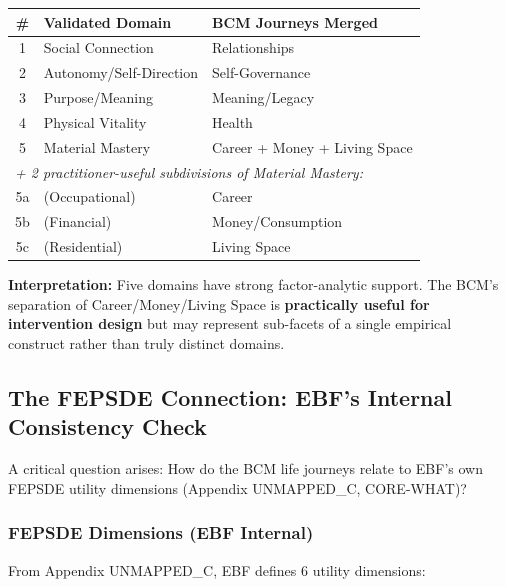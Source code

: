 \begin{center}
\begin{tabular}{@{}clp{5cm}@{}}
\toprule
\textbf{\#} & \textbf{Validated Domain} & \textbf{BCM Journeys Merged} \\
\midrule
1 & Social Connection & Relationships \\
2 & Autonomy/Self-Direction & Self-Governance \\
3 & Purpose/Meaning & Meaning/Legacy \\
4 & Physical Vitality & Health \\
5 & Material Mastery & Career + Money + Living Space \\
\midrule
\multicolumn{3}{l}{\textit{+ 2 practitioner-useful subdivisions of Material Mastery:}} \\
5a & (Occupational) & Career \\
5b & (Financial) & Money/Consumption \\
5c & (Residential) & Living Space \\
\bottomrule
\end{tabular}
\end{center}

\textbf{Interpretation:} Five domains have strong factor-analytic support. The BCM's separation of Career/Money/Living Space is \textbf{practically useful for intervention design} but may represent sub-facets of a single empirical construct rather than truly distinct domains.


\subsection{The FEPSDE Connection: EBF's Internal Consistency Check}
\label{sec:bj-fepsde}

A critical question arises: How do the BCM life journeys relate to EBF's own FEPSDE utility dimensions (Appendix UNMAPPED_C, CORE-WHAT)?

\subsubsection{FEPSDE Dimensions (EBF Internal)}

From Appendix UNMAPPED_C, EBF defines 6 utility dimensions:


